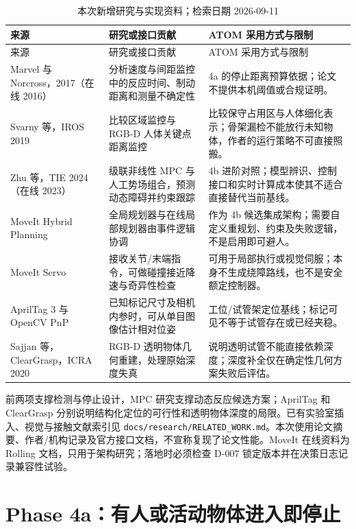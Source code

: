 \begin{longtable}{L{3.3cm}L{5.3cm}L{5.9cm}}
\caption{本次新增研究与实现资料；检索日期 2026-09-11}\\
\toprule
来源 & 研究或接口贡献 & ATOM 采用方式与限制 \\
\midrule
\endfirsthead
\toprule
来源 & 研究或接口贡献 & ATOM 采用方式与限制 \\
\midrule
\endhead
Marvel 与 Norcross，2017（在线 2016）\cite{marvel2017ssm} & 分析速度与间距监控中的反应时间、制动距离和测量不确定性 & 4a 的停止距离预算依据；论文不提供本机阈值或合规证明。 \\
Svarny 等，IROS 2019\cite{svarny2019hri} & 比较区域监控与 RGB-D 人体关键点距离监控 & 比较保守占用区与人体细化表示；骨架漏检不能放行未知物体，作者的运行策略不可直接照搬。 \\
Zhu 等，TIE 2024（在线 2023）\cite{zhu2024dynamic} & 级联非线性 MPC 与人工势场组合，预测动态障碍并约束跟踪 & 4b 进阶对照；模型辨识、控制接口和实时计算成本使其不适合直接替代当前基线。 \\
MoveIt Hybrid Planning\cite{moveithybrid2026} & 全局规划器与在线局部规划器由事件逻辑协调 & 作为 4b 候选集成架构；需要自定义重规划、约束及失败逻辑，不是启用即可避人。 \\
MoveIt Servo\cite{moveitservo2026} & 接收关节/末端指令，可做碰撞接近降速与奇异性检查 & 可用于局部执行或视觉伺服；本身不生成绕障路线，也不是安全额定控制器。 \\
AprilTag 3 与 OpenCV PnP\cite{krogius2019apriltag3,apriltagrepo2026,opencvpose2026} & 已知标记尺寸及相机内参时，可从单目图像估计相对位姿 & 工位/试管架定位基线；标记可见不等于试管存在或已经夹稳。 \\
Sajjan 等，ClearGrasp，ICRA 2020\cite{sajjan2020cleargrasp} & RGB-D 透明物体几何重建，处理原始深度失真 & 说明透明试管不能直接依赖深度；深度补全仅在确定性几何方案失败后评估。 \\
\bottomrule
\end{longtable}

前两项支撑检测与停止设计，MPC 研究支撑动态反应候选方案；AprilTag 和 ClearGrasp 分别说明结构化定位的可行性和透明物体深度的局限。已有实验室插入、视觉与接触文献索引见 \texttt{docs/research/RELATED\_WORK.md}。本次使用论文摘要、作者/机构记录及官方接口文档，不宣称复现了论文性能。MoveIt 在线资料为 Rolling 文档，只用于架构研究；落地时必须检查 D-007 锁定版本并在决策日志记录兼容性试验。

\section{Phase 4a：有人或活动物体进入即停止}

